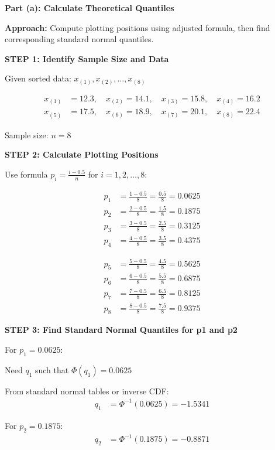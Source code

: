 \documentclass[12pt]{article}
\begin{document}
\begin{solution}

\textbf{Part (a): Calculate Theoretical Quantiles}

\textbf{Approach:} Compute plotting positions using adjusted formula, then find corresponding standard normal quantiles.

\textbf{STEP 1: Identify Sample Size and Data}

Given sorted data: $x_{(1)}, x_{(2)}, \ldots, x_{(8)}$

\begin{align*}
x_{(1)} &= 12.3, \quad x_{(2)} = 14.1, \quad x_{(3)} = 15.8, \quad x_{(4)} = 16.2 \\
x_{(5)} &= 17.5, \quad x_{(6)} = 18.9, \quad x_{(7)} = 20.1, \quad x_{(8)} = 22.4
\end{align*}

Sample size: $n = 8$

\textbf{STEP 2: Calculate Plotting Positions}

Use formula $p_i = \frac{i - 0.5}{n}$ for $i = 1, 2, \ldots, 8$:

\begin{align*}
p_1 &= \frac{1 - 0.5}{8} = \frac{0.5}{8} = 0.0625 \\
p_2 &= \frac{2 - 0.5}{8} = \frac{1.5}{8} = 0.1875 \\
p_3 &= \frac{3 - 0.5}{8} = \frac{2.5}{8} = 0.3125 \\
p_4 &= \frac{4 - 0.5}{8} = \frac{3.5}{8} = 0.4375
\end{align*}

\begin{align*}
p_5 &= \frac{5 - 0.5}{8} = \frac{4.5}{8} = 0.5625 \\
p_6 &= \frac{6 - 0.5}{8} = \frac{5.5}{8} = 0.6875 \\
p_7 &= \frac{7 - 0.5}{8} = \frac{6.5}{8} = 0.8125 \\
p_8 &= \frac{8 - 0.5}{8} = \frac{7.5}{8} = 0.9375
\end{align*}

\textbf{STEP 3: Find Standard Normal Quantiles for p1 and p2}

For $p_1 = 0.0625$:

Need $q_1$ such that $\Phi(q_1) = 0.0625$

From standard normal tables or inverse CDF:
\begin{align*}
q_1 &= \Phi^{-1}(0.0625) = -1.5341
\end{align*}

For $p_2 = 0.1875$:
\begin{align*}
q_2 &= \Phi^{-1}(0.1875) = -0.8871
\end{align*}


\end{solution}
\end{document}

